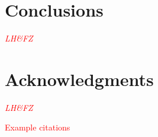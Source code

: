 \documentclass[journal]{new-aiaa}
\begin{document}
\section{Conclusions}

\textcolor{red}{\emph{LH\&FZ}}



\section*{Acknowledgments} %

\textcolor{red}{\emph{LH\&FZ}}


\textcolor{red}{Example citations}

\cite{nakamura1993bluffbody}


\end{document}
